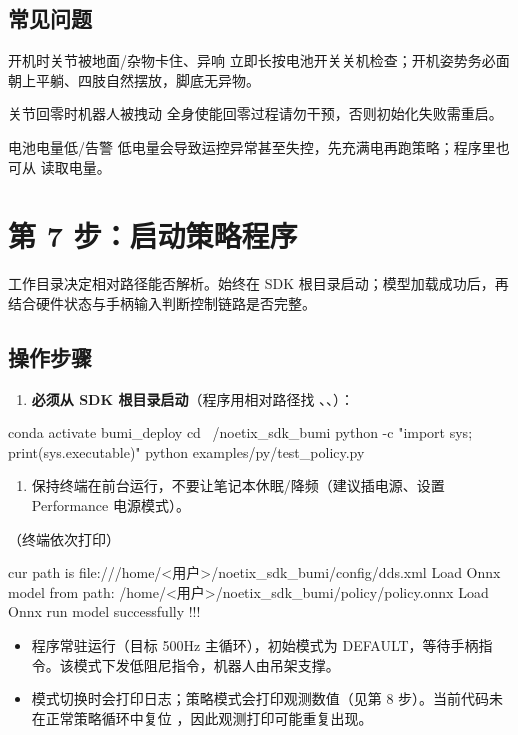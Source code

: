 \subsection*{常见问题}
\begin{faq}{开机时关节被地面/杂物卡住、异响}
立即长按电池开关关机检查；开机姿势务必面朝上平躺、四肢自然摆放，脚底无异物。
\end{faq}
\begin{faq}{关节回零时机器人被拽动}
全身使能回零过程请勿干预，否则初始化失败需重启。
\end{faq}
\begin{faq}{电池电量低/告警}
低电量会导致运控异常甚至失控，先充满电再跑策略；程序里也可从  读取电量。
\end{faq}


\section{第 7 步：启动策略程序}
\label{step:7}
工作目录决定相对路径能否解析。始终在 SDK 根目录启动；模型加载成功后，再结合硬件状态与手柄输入判断控制链路是否完整。


\subsection*{操作步骤}
\begin{enumerate}
\item \textbf{必须从 SDK 根目录启动}（程序用相对路径找 、、）：

\end{enumerate}
\begin{command}
conda activate bumi_deploy
cd ~/noetix_sdk_bumi
python -c "import sys; print(sys.executable)"
python examples/py/test_policy.py
\end{command}

\begin{enumerate}[resume]
\item 保持终端在前台运行，不要让笔记本休眠/降频（建议插电源、设置 Performance 电源模式）。

\end{enumerate}
\begin{expected}
（终端依次打印）
\begin{command}
cur path is file:///home/<用户>/noetix_sdk_bumi/config/dds.xml
Load Onnx model from path: /home/<用户>/noetix_sdk_bumi/policy/policy.onnx
Load Onnx run model successfully !!!
\end{command}
\begin{itemize}
\item 程序常驻运行（目标 500Hz 主循环），初始模式为 DEFAULT，等待手柄指令。该模式下发低阻尼指令，机器人由吊架支撑。
\item 模式切换时会打印日志；策略模式会打印观测数值（见第 8 步）。当前代码未在正常策略循环中复位 ，因此观测打印可能重复出现。

\end{itemize}
\end{expected}
